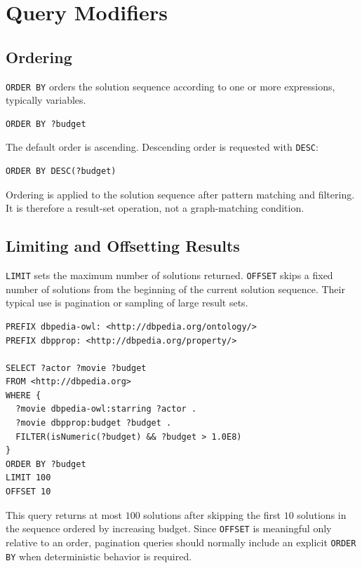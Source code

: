 \documentclass{scrbook}
\begin{document}
	\section{Query Modifiers}
	
	\subsection{Ordering}
	
	\texttt{ORDER BY} orders the solution sequence according to one or more expressions, typically variables.
	
	\begin{lstlisting}
ORDER BY ?budget
	\end{lstlisting}
	
	The default order is ascending. Descending order is requested with \texttt{DESC}:
	
	\begin{lstlisting}
ORDER BY DESC(?budget)
	\end{lstlisting}
	
	Ordering is applied to the solution sequence after pattern matching and filtering. It is therefore a result-set operation, not a graph-matching condition.
	
	\subsection{Limiting and Offsetting Results}
	
	\texttt{LIMIT} sets the maximum number of solutions returned. \texttt{OFFSET} skips a fixed number of solutions from the beginning of the current solution sequence. Their typical use is pagination or sampling of large result sets.
	
	\begin{lstlisting}
PREFIX dbpedia-owl: <http://dbpedia.org/ontology/>
PREFIX dbpprop: <http://dbpedia.org/property/>

SELECT ?actor ?movie ?budget
FROM <http://dbpedia.org>
WHERE {
  ?movie dbpedia-owl:starring ?actor .
  ?movie dbpprop:budget ?budget .
  FILTER(isNumeric(?budget) && ?budget > 1.0E8)
}
ORDER BY ?budget
LIMIT 100
OFFSET 10
	\end{lstlisting}
	
	This query returns at most \(100\) solutions after skipping the first \(10\) solutions in the sequence ordered by increasing budget. Since \texttt{OFFSET} is meaningful only relative to an order, pagination queries should normally include an explicit \texttt{ORDER BY} when deterministic behavior is required.
	
\end{document}
